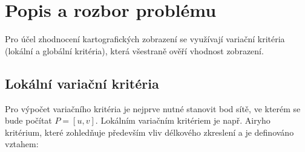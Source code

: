 \documentclass[12pt, a4paper]{article}
\begin{document}
\begin{center}
\end{center}
\vspace{5mm}




\newpage
\section{Popis a rozbor problému}
Pro účel zhodnocení kartografických zobrazení se využívají variační kritéria (lokální a globální kritéria), která všestraně ověří vhodnost zobrazení.

\subsection*{Lokální variační kritéria}
Pro výpočet variačního kritéria je nejprve nutné stanovit bod sítě, ve kterém se bude počítat $P = [u, v]$. Lokálním variačním kritériem je např. Airyho kritérium, které zohledňuje především vliv délkového zkreslení a je definováno vztahem:
\end{document}
